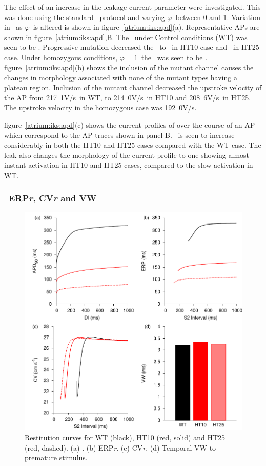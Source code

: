 The effect of an increase in the leakage current parameter were investigated.
This was done using the standard \apd\ protocol and varying $\varphi$\ between
0 and 1.
Variation in \apd\ as $\varphi$\ is altered is shown in
figure~\ref{atrium:iks:apd}(a).
Representative APs are shown in figure~\ref{atrium:iks:apd},B.
The \apd\ under Control conditions (WT) was seen to be .
Progressive mutation decreased the \apd\ to \ in HT10 case and
\ in HT25 case.
Under homozygous conditions, $\varphi = 1$\, the \apd\ was seen to be .
figure~\ref{atrium:iks:apd}(b) shows the inclusion of the mutant channel causes
the changes in morphology associated with none of the mutant types having a
plateau region.
Inclusion of the mutant channel decreased the upstroke velocity of the AP from
\unit{217.1}{V/s}\ in WT, to \unit{214.0}{V/s}\ in HT10 and \unit{208.6}{V/s}\
in HT25.
The upstroke velocity in the homozygous case was \unit{192.0}{V/s}.

figure~\ref{atrium:iks:apd}(c) shows the current profiles of  over the course of
an AP which correspond to the AP traces shown in panel B.
\ii{Ks}\ is seen to increase considerably in both the HT10 and HT25 cases
compared with the WT case.
The leak also changes the morphology of the current profile to one showing
almost instant activation in HT10 and HT25 cases, compared to the slow
activation in WT.

\subsubsection{\apdr\, ERP\emph{r}, CV\emph{r} and VW}

\begin{figure}
\includegraphics{figures/atrium/iks/figures/03_REST}
\caption[Restitution properties with S140G mutation]{
\label{atrium:iks:apdretal}
Restitution curves for WT (black), HT10 (red, solid) and HT25 (red, dashed).
(a) \apdr.
(b) ERP\emph{r}.
(c) CV\emph{r}.
(d) Temporal VW to premature stimulus.
}
\end{figure}

